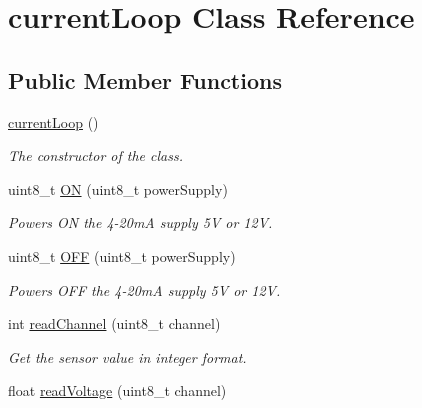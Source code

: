 \hypertarget{classcurrent_loop}{}\section{current\+Loop Class Reference}
\label{classcurrent_loop}
\subsection*{Public Member Functions}
\begin{DoxyCompactItemize}
\item 
\hyperlink{classcurrent_loop_a55742b5324bc1ec97003a66f9b668781}{current\+Loop} ()\hypertarget{classcurrent_loop_a55742b5324bc1ec97003a66f9b668781}{}\label{classcurrent_loop_a55742b5324bc1ec97003a66f9b668781}

\begin{DoxyCompactList}\small\item\em The constructor of the class. \end{DoxyCompactList}\item 
uint8\+\_\+t \hyperlink{classcurrent_loop_a1f66e65f1cffac2572fb36d8b294de93}{ON} (uint8\+\_\+t power\+Supply)\hypertarget{classcurrent_loop_a1f66e65f1cffac2572fb36d8b294de93}{}\label{classcurrent_loop_a1f66e65f1cffac2572fb36d8b294de93}

\begin{DoxyCompactList}\small\item\em Powers ON the 4-\/20mA supply 5V or 12V. \end{DoxyCompactList}\item 
uint8\+\_\+t \hyperlink{classcurrent_loop_a2b03dd4d53fa6f74c5e738cd91330260}{O\+FF} (uint8\+\_\+t power\+Supply)\hypertarget{classcurrent_loop_a2b03dd4d53fa6f74c5e738cd91330260}{}\label{classcurrent_loop_a2b03dd4d53fa6f74c5e738cd91330260}

\begin{DoxyCompactList}\small\item\em Powers O\+FF the 4-\/20mA supply 5V or 12V. \end{DoxyCompactList}\item 
int \hyperlink{classcurrent_loop_a4fed14933bfd22a7ee3a367a1162be53}{read\+Channel} (uint8\+\_\+t channel)\hypertarget{classcurrent_loop_a4fed14933bfd22a7ee3a367a1162be53}{}\label{classcurrent_loop_a4fed14933bfd22a7ee3a367a1162be53}

\begin{DoxyCompactList}\small\item\em Get the sensor value in integer format. \end{DoxyCompactList}\item 
float \hyperlink{classcurrent_loop_a38532f653a76e728701c60ca6677a393}{read\+Voltage} (uint8\+\_\+t channel)\hypertarget{classcurrent_loop_a38532f653a76e728701c60ca6677a393}{}\label{classcurrent_loop_a38532f653a76e728701c60ca6677a393}


\end{DoxyCompactItemize}
